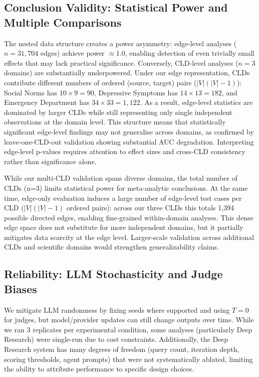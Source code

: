 \subsection{Conclusion Validity: Statistical Power and Multiple Comparisons}

The nested data structure creates a power asymmetry: edge-level analyses ($n = 31{,}704$ edges) achieve power $\approx 1.0$, enabling detection of even trivially small effects that may lack practical significance. Conversely, CLD-level analyses ($n = 3$ domains) are substantially underpowered. Under our edge representation, CLDs contribute different numbers of ordered (source, target) pairs ($|V|(|V|-1)$): Social Norms has $10\times 9=90$, Depressive Symptoms has $14\times 13=182$, and Emergency Department has $34\times 33=1{,}122$. As a result, edge-level statistics are dominated by larger CLDs while still representing only single independent observations at the domain level. This structure means that statistically significant edge-level findings may not generalise across domains, as confirmed by leave-one-CLD-out validation showing substantial AUC degradation. Interpreting edge-level p-values requires attention to effect sizes and cross-CLD consistency rather than significance alone.

While our multi-CLD validation spans diverse domains, the total number of CLDs (n=3) limits statistical power for meta-analytic conclusions. At the same time, edge-only evaluation induces a large number of edge-level test cases per CLD ($|V|(|V|-1)$ ordered pairs): across our three CLDs this totals 1,394 possible directed edges, enabling fine-grained within-domain analyses. This dense edge space does not substitute for more independent domains, but it partially mitigates data scarcity at the edge level. Larger-scale validation across additional CLDs and scientific domains would strengthen generalizability claims.



\subsection{Reliability: LLM Stochasticity and Judge Biases}

We mitigate LLM randomness by fixing seeds where supported and using $T{=}0$ for judges, but model/provider updates can still change outputs over time. While we ran 3 replicates per experimental condition, some analyses (particularly Deep Research) were single-run due to cost constraints. Additionally, the Deep Research system has many degrees of freedom (query count, iteration depth, scoring thresholds, agent prompts) that were not systematically ablated, limiting the ability to attribute performance to specific design choices.

